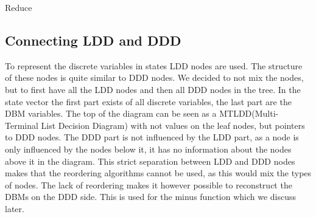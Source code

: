 \begin{algorithm}
\caption{Reduce}\label{alg:ReduceZero}
\begin{algorithmic}[1]
				\EndIf
			\EndFor
		\EndIf
	\EndFor
				\Break
			\EndIf
		\EndFor
	\EndFor
		\EndFor
	\EndFor
					\EndIf
				\EndFor
			\EndIf
		\EndFor
		\EndFor
	\EndFor
		
\EndProcedure
\end{algorithmic}
\end{algorithm}

\subsection{Connecting LDD and DDD}
To represent the discrete variables in states LDD nodes are used. The structure of these nodes is quite similar to DDD nodes. We decided to not mix the nodes, but to first have all the LDD nodes and then all DDD nodes in the tree. In the state vector the first part exists of all discrete variables, the last part are the DBM variables. The top of the diagram can be seen as a MTLDD(Multi-Terminal List Decision Diagram) with not values on the leaf nodes, but pointers to DDD nodes. The DDD part is not influenced by the LDD part, as a node is only influenced by the nodes below it, it has no information about the nodes above it in the diagram. This strict separation between LDD and DDD nodes makes that the reordering algorithms cannot be used, as this would mix the types of nodes. The lack of reordering makes it however possible to reconstruct the DBMs on the DDD side. This is used for the minus function which we discuss later.

